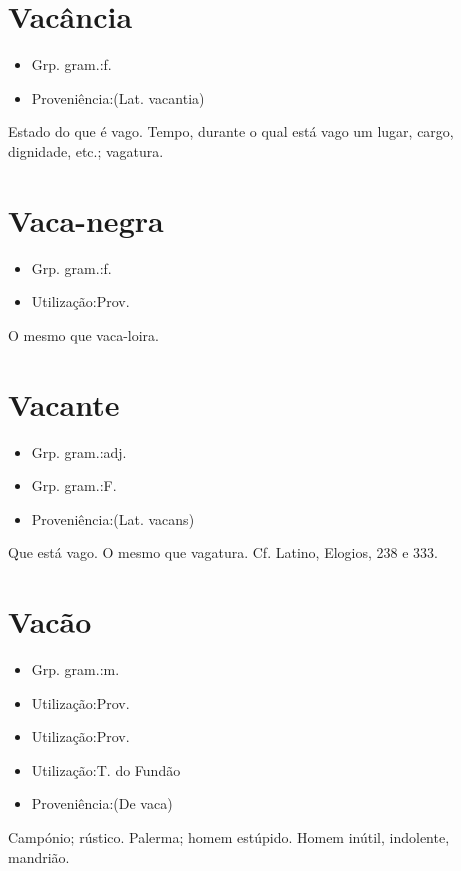 \documentclass{article}
\begin{document}
\section{Vacância}
\begin{itemize}
\item {Grp. gram.:f.}
\end{itemize}
\begin{itemize}
\item {Proveniência:(Lat. \textunderscore vacantia\textunderscore )}
\end{itemize}
Estado do que é vago.
Tempo, durante o qual está vago um lugar, cargo, dignidade, etc.; vagatura.
\section{Vaca-negra}
\begin{itemize}
\item {Grp. gram.:f.}
\end{itemize}
\begin{itemize}
\item {Utilização:Prov.}
\end{itemize}
O mesmo que \textunderscore vaca-loira\textunderscore .
\section{Vacante}
\begin{itemize}
\item {Grp. gram.:adj.}
\end{itemize}
\begin{itemize}
\item {Grp. gram.:F.}
\end{itemize}
\begin{itemize}
\item {Proveniência:(Lat. \textunderscore vacans\textunderscore )}
\end{itemize}
Que está vago.
O mesmo que \textunderscore vagatura\textunderscore . Cf. Latino, \textunderscore Elogios\textunderscore , 238 e 333.
\section{Vacão}
\begin{itemize}
\item {Grp. gram.:m.}
\end{itemize}
\begin{itemize}
\item {Utilização:Prov.}
\end{itemize}
\begin{itemize}
\item {Utilização:Prov.}
\end{itemize}
\begin{itemize}
\item {Utilização:T. do Fundão}
\end{itemize}
\begin{itemize}
\item {Proveniência:(De \textunderscore vaca\textunderscore )}
\end{itemize}
Campónio; rústico.
Palerma; homem estúpido.
Homem inútil, indolente, mandrião.
\end{document}
